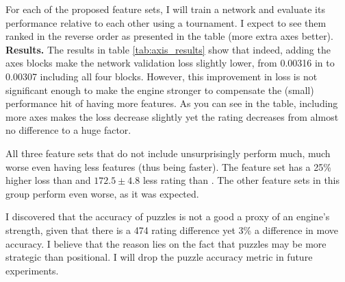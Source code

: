 For each of the proposed feature sets, I will train a network and evaluate its performance relative to each other using a tournament. I expect to see them ranked in the reverse order as presented in the table (more extra axes better). \\

\textbf{Results.} The results in table \ref{tab:axis_results} show that indeed, adding the axes blocks make the network validation loss slightly lower, from 0.00316 in  to 0.00307 including all four blocks. However, this improvement in loss is not significant enough to make the engine stronger to compensate the (small) performance hit of having more features. As you can see in the table, including more axes makes the loss decrease slightly yet the rating decreases from almost no difference to a huge factor.

All three feature sets that do not include  unsurprisingly perform much, much worse even having less features (thus being faster). The feature set  has a 25\% higher loss than  and $172.5 \pm 4.8$ less rating than . The other feature sets in this group perform even worse, as it was expected.

I discovered that the accuracy of puzzles is not a good a proxy of an engine's strength, given that there is a 474 rating difference yet 3\% a difference in move accuracy. I believe that the reason lies on the fact that puzzles may be more strategic than positional. I will drop the puzzle accuracy metric in future experiments.

